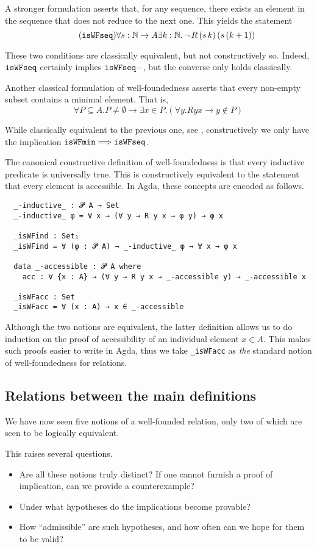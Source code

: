 A stronger formulation asserts that, for any sequence, there exists an element
in the sequence that does not reduce to the next one.  This yields the statement
\[\tag{$\isWFseq$} \forall s : \nat \to A \exists k : \nat.\, \lnot \, R \,(s\,k)\,(s\,(k+1)) \]

These two conditions are classically equivalent, but not constructively so.
Indeed, $\mathtt{isWFseq}$ certainly implies $\mathtt{isWFseq-}$, but the converse only holds classically.

Another classical formulation of well-foundedness
asserts that every non-empty subset
contains a minimal element.  That is,
\[ \tag{$\isWFmin$} \forall P \subseteq A. P \neq \emptyset \to \exists x \in P. (\forall y. Ryx \to y\notin P) \]

While classically equivalent to the previous one, see \cite[Exercise A.1.8]{Terese},
constructively we only have the implication $\mathtt{isWFmin} \Longrightarrow \mathtt{isWFseq}$.

The canonical constructive definition of well-foundedness is that
every inductive predicate is universally true.
This is constructively equivalent to the statement that every element
is accessible.  In Agda, these concepts are encoded as follows.
{\small
\begin{verbatim}
  _-inductive_ : 𝓟 A → Set
  _-inductive_ φ = ∀ x → (∀ y → R y x → φ y) → φ x

  _isWFind : Set₁
  _isWFind = ∀ (φ : 𝓟 A) → _-inductive_ φ → ∀ x → φ x

  data _-accessible : 𝓟 A where
    acc : ∀ {x : A} → (∀ y → R y x → _-accessible y) → _-accessible x

  _isWFacc : Set
  _isWFacc = ∀ (x : A) → x ∈ _-accessible
\end{verbatim}
}
Although the two notions are equivalent, the latter definition allows us to do induction on the proof of accessibility of an individual element $x \in A$.  This makes such proofs easier to write in Agda, thus we take
\verb|_isWFacc| as \emph{the} standard notion of well-foundedness for relations.

\subsection{Relations between the main definitions}

We have now seen five notions of a well-founded relation, only two of which
are seen to be logically equivalent.

This raises several questions.
\begin{itemize}
\item Are all these notions truly distinct?  If one cannot furnish a proof of implication,
can we provide a counterexample?
\item Under what hypotheses do the implications become provable?
\item How ``admissible'' are such hypotheses, and how often can we hope for them to be valid?
\end{itemize}

